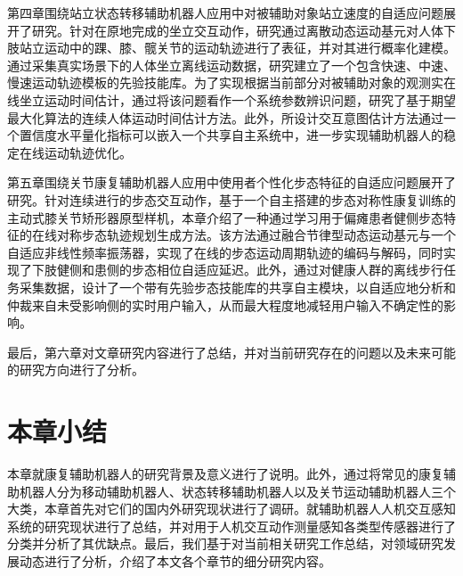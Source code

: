 第四章围绕站立状态转移辅助机器人应用中对被辅助对象站立速度的自适应问题展开了研究。针对在原地完成的坐立交互动作，研究通过离散动态运动基元对人体下肢站立运动中的踝、膝、髋关节的运动轨迹进行了表征，并对其进行概率化建模。通过采集真实场景下的人体坐立离线运动数据，研究建立了一个包含快速、中速、慢速运动轨迹模板的先验技能库。为了实现根据当前部分对被辅助对象的观测实在线坐立运动时间估计，通过将该问题看作一个系统参数辨识问题，研究了基于期望最大化算法的连续人体运动时间估计方法。此外，所设计交互意图估计方法通过一个置信度水平量化指标可以嵌入一个共享自主系统中，进一步实现辅助机器人的稳定在线运动轨迹优化。

第五章围绕关节康复辅助机器人应用中使用者个性化步态特征的自适应问题展开了研究。针对连续进行的步态交互动作，基于一个自主搭建的步态对称性康复训练的主动式膝关节矫形器原型样机，本章介绍了一种通过学习用于偏瘫患者健侧步态特征的在线对称步态轨迹规划生成方法。该方法通过融合节律型动态运动基元与一个自适应非线性频率振荡器，实现了在线的步态运动周期轨迹的编码与解码，同时实现了下肢健侧和患侧的步态相位自适应延迟。此外，通过对健康人群的离线步行任务采集数据，设计了一个带有先验步态技能库的共享自主模块，以自适应地分析和仲裁来自未受影响侧的实时用户输入，从而最大程度地减轻用户输入不确定性的影响。

最后，第六章对文章研究内容进行了总结，并对当前研究存在的问题以及未来可能的研究方向进行了分析。

\section{本章小结}
本章就康复辅助机器人的研究背景及意义进行了说明。此外，通过将常见的康复辅助机器人分为移动辅助机器人、状态转移辅助机器人以及关节运动辅助机器人三个大类，本章首先对它们的国内外研究现状进行了调研。就辅助机器人人机交互感知系统的研究现状进行了总结，并对用于人机交互动作测量感知各类型传感器进行了分类并分析了其优缺点。最后，我们基于对当前相关研究工作总结，对领域研究发展动态进行了分析，介绍了本文各个章节的细分研究内容。
